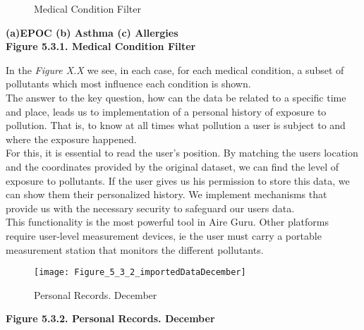 \begin{figure}[ht]
  \centering
  \hfill
  \hfill
  \caption{Medical Condition Filter}
\end{figure}

\begin{center}
  \bf{ (a)EPOC (b) Asthma (c) Allergies\\
  
  Figure 5.3.1. Medical Condition Filter}
\end{center} 

In the \textit{Figure X.X} we see, in each case, for each medical condition, a subset of pollutants which most influence each condition is shown.\\
  
The answer to the key question, how can the data be related to a specific time and place, leads us to
implementation of a personal history of exposure to pollution. That is, to know at all times what pollution
a user is subject to and where the exposure happened.\\

For this, it is essential to read the user's position. By matching the users location and the coordinates provided by the original dataset,
we can find the level of exposure to pollutants. If the user gives us his permission to store this data, we can show them their personalized history.
We implement mechanisms that provide us with the necessary security to safeguard our users data.\\

This functionality is the most powerful tool in Aire Guru. Other platforms require user-level measurement devices, ie the user must carry
a portable measurement station that monitors the different pollutants.\\

\begin{figure}[ht]
  \centering
  \texttt{[image: Figure\_5\_3\_2\_importedDataDecember]}
  \caption{Personal Records. December}
\end{figure}

\begin{center}
  \bf{ 
  Figure 5.3.2. Personal Records. December}
\end{center} 

